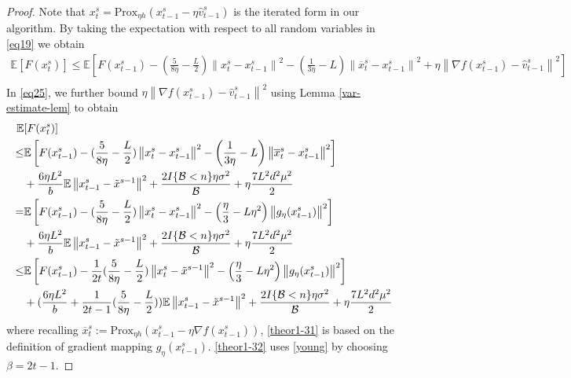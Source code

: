 \documentclass{article}
\newcommand*{\Po}{\text{Prox}}
\newcommand*{\E}{\mathbb{E}}
\newcommand{\norm}[1]{\left\lVert#1\right\rVert}
\theoremstyle{definition}
\theoremstyle{remark}
\begin{document}
\begin{proof}
Note that $x_t^s = \Po_{\eta h}(x_{t-1}^s - \eta \hat{v}_{t-1}^s)$ is the iterated form in our algorithm.  By taking the expectation with respect to all random variables in \eqref{eq19} we obtain
 \begin{equation}\label{eq25}
 \begin{split} 
\E[F({x}_{t}^s)] \leq \E\left[F({x}_{t-1}^s)  -(\frac{5}{8\eta} - \frac{L}{2})\norm{{x}_t^s-x_{t-1}^s}^2- \left(\frac{1}{3\eta}-L\right)\norm{\overline{x}_t^s-x_{t-1}^s}^2+\eta \norm{\nabla f(x_{t-1}^s)-\hat{v}_{t-1}^s}^2\right]\\
 \end{split}
 \end{equation}
In \eqref{eq25}, we further bound $\eta \norm{\nabla f(x_{t-1}^s)-\hat{v}_{t-1}^s}^2$ using Lemma \ref{var-estimate-lem} to obtain
 \begin{align} 
\E&[F({x}_{t}^s)] \notag
\notag
\\ \leq& \E\left[F({x}_{t-1}^s)  -(\frac{5}{8\eta} - \frac{L}{2})\norm{{x}_t^s-x_{t-1}^s}^2- \left(\frac{1}{3\eta}-L\right)\norm{\overline{x}_t^s-x_{t-1}^s}^2\right]\notag\\
&+ \frac{6\eta L^2}{b}\E\norm{x_{t-1}^s-\tilde{x}^{s-1}}^2 + \frac{2I\{\mathcal{B} < n\}\eta \sigma ^2}{\mathcal{B}}+\eta \frac{7 L^2 d^2 \mu^2}{2}\notag
\\ =& \E\left[F({x}_{t-1}^s)  -(\frac{5}{8\eta} - \frac{L}{2})\norm{{x}_t^s-x_{t-1}^s}^2- \left(\frac{\eta}{3}-L\eta^2\right)\norm{g_{\eta}(x_{t-1}^s)}^2\right]\notag
\\&+\frac{6\eta L^2}{b}\E\norm{x_{t-1}^s-\tilde{x}^{s-1}}^2+ \frac{2I\{\mathcal{B} < n\}\eta \sigma ^2}{\mathcal{B}}+\eta \frac{7L^2 d^2 \mu^2}{2}\label{theor1-31}
\\ \leq& \E\left[F({x}_{t-1}^s)  -\frac{1}{2t}(\frac{5}{8\eta} - \frac{L}{2})\norm{{x}_t^s-\tilde{x}^{s-1}}^2- \left(\frac{\eta}{3}-L\eta^2\right)\norm{g_{\eta}(x_{t-1}^s)}^2\right]\notag\\
&+(\frac{6\eta L^2}{b}+\frac{1}{2t-1}(\frac{5}{8\eta} - \frac{L}{2}))\E\norm{x_{t-1}^s-\tilde{x}^{s-1}}^2
+ \frac{2I\{\mathcal{B} < n\}\eta \sigma ^2}{\mathcal{B}}+\eta \frac{7 L^2 d^2 \mu^2}{2}\label{theor1-32}
 \end{align}
where recalling $\overline{x}_t^s := \Po_{\eta h}(x_{t-1}^s - \eta \nabla f(x_{t-1}^s))$, \eqref{theor1-31}  is based on the definition of gradient mapping $g_{\eta}(x_{t-1}^s)$. \eqref{theor1-32} uses \eqref{young} by choosing $\beta = 2t-1$.
 

\end{proof}
\end{document}
